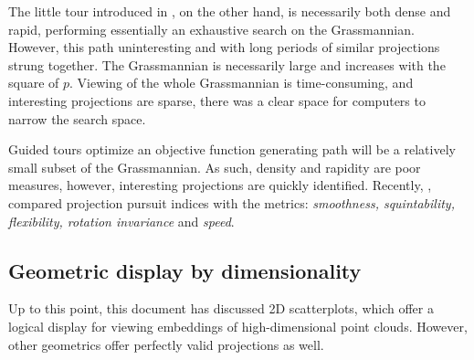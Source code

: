 \documentclass{monashthesis}
\begin{document}
The little tour introduced in \textcite{mcdonald_interactive_1982}, on
the other hand, is necessarily both dense and rapid, performing
essentially an exhaustive search on the Grassmannian. However, this path
uninteresting and with long periods of similar projections strung
together. The Grassmannian is necessarily large and increases with the
square of \(p\). Viewing of the whole Grassmannian is time-consuming,
and interesting projections are sparse, there was a clear space for
computers to narrow the search space.

Guided tours \autocite{hurley_analyzing_1990} optimize an objective
function generating path will be a relatively small subset of the
Grassmannian. As such, density and rapidity are poor measures, however,
interesting projections are quickly identified. Recently,
\textcite{laa_using_2019}, compared projection pursuit indices with the
metrics: \emph{smoothness, squintability, flexibility, rotation
invariance} and \emph{speed}.

\subsection{Geometric display by dimensionality}\label{sec:geom_display}

Up to this point, this document has discussed 2D scatterplots, which
offer a logical display for viewing embeddings of high-dimensional point
clouds. However, other geometrics offer perfectly valid projections as
well.
\end{document}
